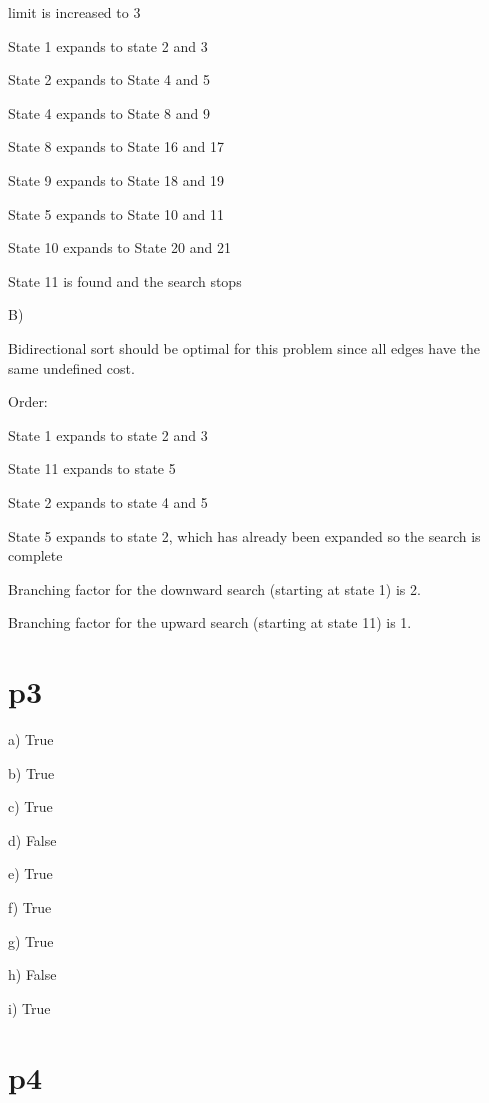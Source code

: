 \documentclass{article}
\begin{document}
limit is increased to 3

State 1 expands to state 2 and 3

State 2 expands to State 4 and 5

State 4 expands to State 8 and 9

State 8 expands to State 16 and 17

State 9 expands to State 18 and 19

State 5 expands to State 10 and 11

State 10 expands to State 20 and 21

State 11 is found and the search stops

\hspace{5mm}

B)

Bidirectional sort should be optimal for this problem since all edges have the same undefined cost.
\newline

Order:

State 1 expands to state 2 and 3

State 11 expands to state 5

State 2 expands to state 4 and 5

State 5 expands to state 2, which has already been expanded so the search is complete
\newline


Branching factor for the downward search (starting at state 1) is 2.

Branching factor for the upward search (starting at state 11) is 1.

\section*{p3}

\hspace{5mm}

a) True

b) True

c) True

d) False

e) True

f) True

g) True

h) False

i) True

\section*{p4}
\end{document}
